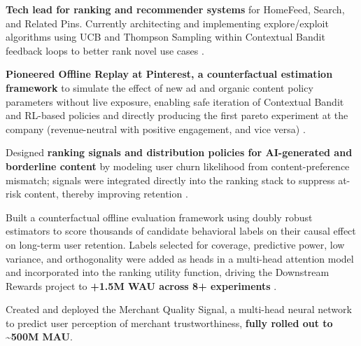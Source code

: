 \documentclass[]{deedy-resume-openfont}
\newcommand{\mybold}[1]{{\latobold\bfseries #1}}
\let\OldHref\href
\renewcommand{\href}[2]{\OldHref{#1}{\latobold #2}}
\let\OldHyperlink\hyperlink
\renewcommand{\hyperlink}[2]{\OldHyperlink{#1}{\latobold #2}}
\begin{document}
\begin{tightemize}
    \item \mybold{Tech lead for ranking and recommender systems} for HomeFeed, Search, and Related Pins. Currently architecting and implementing explore/exploit algorithms using UCB and Thompson Sampling within Contextual Bandit feedback loops to better rank novel use cases \href{https://medium.com/pinterest-engineering/pinner-progression-better-use-case-representation-driving-weekaly-active-user-growth-at-pinterest-bd2131ab238a}{[blog]}.
    \item \mybold{Pioneered Offline Replay at Pinterest, a counterfactual estimation framework} to simulate the effect of new ad and organic content policy parameters without live exposure, enabling safe iteration of Contextual Bandit and RL-based policies and directly producing the first pareto experiment at the company (revenue-neutral with positive engagement, and vice versa) \hyperlink{rl-review-paper}{[paper]}.
    \item Designed \mybold{ranking signals and distribution policies for AI-generated and borderline content} by modeling user churn likelihood from content-preference mismatch; signals were integrated directly into the ranking stack to suppress at-risk content, thereby improving retention \hyperlink{kdd-paper}{[paper]}.
    \item Built a counterfactual offline evaluation framework using doubly robust estimators to score thousands of candidate behavioral labels on their causal effect on long-term user retention. Labels selected for coverage, predictive power, low variance, and orthogonality were added as heads in a multi-head attention model and incorporated into the ranking utility function, driving the Downstream Rewards project to \mybold{+1.5M WAU across 8+ experiments} \hyperlink{revisit-paper}{[paper]}.
    \item Created and deployed the Merchant Quality Signal, a multi-head neural network to predict user perception of merchant trustworthiness, \mybold{fully rolled out to \textasciitilde500M MAU}.
\end{tightemize}

\sectionsep


\sectionsep
\end{document}
